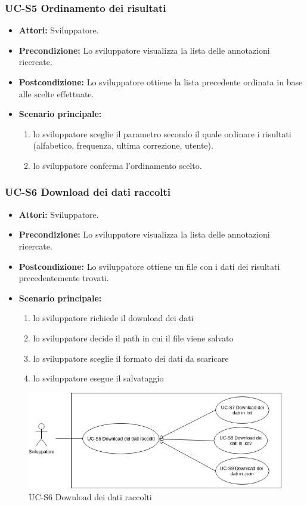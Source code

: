 	\subsubsection{UC-S5 Ordinamento dei risultati}
		\begin{itemize}
			\item \textbf{Attori:} Sviluppatore.
			\item \textbf{Precondizione:} Lo sviluppatore visualizza la lista delle annotazioni ricercate.
			\item \textbf{Postcondizione:} Lo sviluppatore ottiene la lista precedente ordinata in base alle scelte effettuate.
			\item \textbf{Scenario principale:}
				\begin{enumerate}
					\item lo sviluppatore sceglie il parametro secondo il quale ordinare i risultati (alfabetico, frequenza, ultima correzione, utente).
					\item lo sviluppatore conferma l'ordinamento scelto.
				\end{enumerate}
		\end{itemize} 
	
	\subsubsection{UC-S6 Download dei dati raccolti}
		\begin{itemize}
			\item \textbf{Attori:} Sviluppatore.
			\item \textbf{Precondizione:} Lo sviluppatore visualizza la lista delle annotazioni ricercate.
			\item \textbf{Postcondizione:} Lo sviluppatore ottiene un file con i dati dei risultati precedentemente trovati.
			\item \textbf{Scenario principale:}
				\begin{enumerate}
					\item lo sviluppatore richiede il download dei dati
					\item lo sviluppatore decide il path in cui il file viene salvato
					\item lo sviluppatore sceglie il formato dei dati da scaricare
					\item lo sviluppatore esegue il salvataggio
				\end{enumerate}
		\end{itemize}	
		
		\begin{figure}[h]
		\centering
		\includegraphics[scale=0.7]{images/UC-S6.png}
		\caption{UC-S6 Download dei dati raccolti}
	\end{figure}
	
